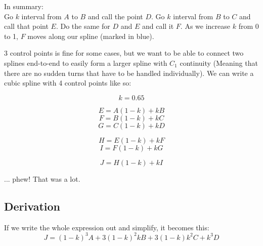 \documentclass[12pt, english]{article}
\begin{document}
In summary: \\
Go $k$ interval from $A$ to $B$ and call the point $D$. Go $k$ interval from $B$ to $C$ and call that point $E$. Do the same for $D$ and $E$ and call it $F$. As we increase $k$ from 0 to 1, $F$ moves along our spline (marked in blue). \\
\par
3 control points is fine for some cases, but we want to be able to connect two splines end-to-end to easily form a larger spline with $C_1$ continuity (Meaning that there are no sudden turns that have to be handled individually). We can write a cubic spline with 4 control points like so:
\begin{center}
	\[ k = 0.65 \]
\end{center}

\[ E = A(1-k) + kB \]
\[ F = B(1-k) + kC \]
\[ G = C(1-k) + kD \]

\[ H = E(1-k) + kF \]
\[ I = F(1-k) + kG \]

\[ J = H(1-k) + kI \]

... phew! That was a lot. \\
\par

\subsection{Derivation}
If we write the whole expression out and simplify, it becomes this:
\[
	J=(1-k)^{3} A+3(1-k)^{2}k B+3(1-k)k^{2} C+k^{3}D
\]
\end{document}
